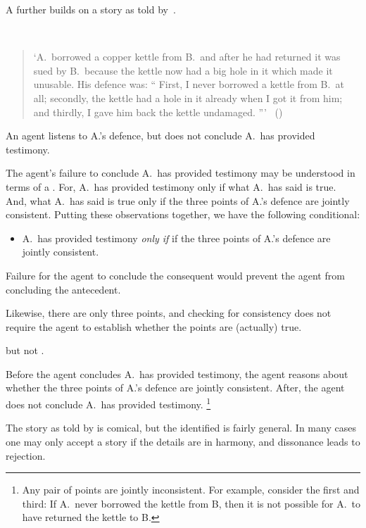 \begin{note}
  A further  builds on a story as told by~\citeauthor{Freud:1960wx}.
  \begin{illustration}
    \label{illu:kettle}
    \mbox{ }
    \vspace{-\baselineskip}
    \begin{quote}
      `A.\ borrowed a copper kettle from B.\ and after he had returned it was sued by B.\ because the kettle now had a big hole in it which made it unusable.
      His defence was:
      ``%
      First, I never borrowed a kettle from B.\ at all;
      secondly, the kettle had a hole in it already when I got it from him;
      and thirdly, I gave him back the kettle undamaged.%
      '''\newline
      \mbox{ }\hfill\mbox{(\citeyear[62]{Freud:1960wx})}
    \end{quote}
    An agent listens to A.'s defence, but does not conclude A.\ has provided testimony.
  \end{illustration}

  The agent's failure to conclude A.\ has provided testimony may be understood in terms of a \requ{}.
  For, A.\ has provided testimony only if what A.\ has said is true.
  And, what A.\ has said is true only if the three points of A.'s defence are jointly consistent.
  Putting these observations together, we have the following conditional:

  \begin{itemize}
  \item
    A.\ has provided testimony \emph{only if} if the three points of A.'s defence are jointly consistent.
  \end{itemize}

  Failure for the agent to conclude the consequent would prevent the agent from concluding the antecedent.

  Likewise, there are only three points, and checking for consistency does not require the agent to establish whether the points are (actually) true.

  \requ{} but not \fc{}.

  Before the agent concludes A.\ has provided testimony, the agent reasons about whether the three points of A.'s defence are jointly consistent.
  After, the agent does not conclude A.\ has provided testimony.%
  \footnote{
    Any pair of points are jointly inconsistent.
    For example, consider the first and third:
    If A.\ never borrowed the kettle from B, then it is not possible for A.\ to have returned the kettle to B.
  }

  The story as told by \citeauthor{Freud:1960wx} is comical, but the  identified is fairly general.
  In many cases one may only accept a story if the details are in harmony, and dissonance leads to rejection.
\end{note}

